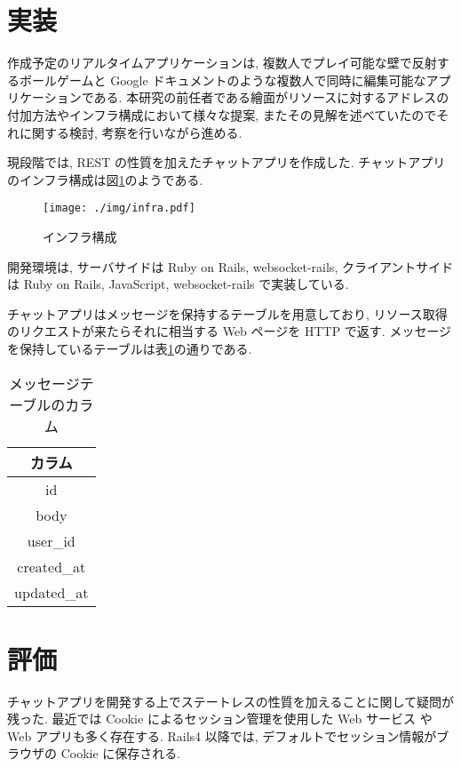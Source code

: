\documentclass[a4j, 10pt, twocolumn]{ujarticle}
\begin{document}
    \section{実装}
     作成予定のリアルタイムアプリケーションは, 複数人でプレイ可能な壁で反射するボールゲームと Google ドキュメントのような複数人で同時に編集可能なアプリケーションである.
     本研究の前任者である繪面がリソースに対するアドレスの付加方法やインフラ構成において様々な提案, またその見解を述べていた\cite{mt:YukaEzura}のでそれに関する検討, 考察を行いながら進める. 

    現段階では, REST の性質を加えたチャットアプリを作成した. 
    チャットアプリのインフラ構成は図\ref{fig:infra}のようである. 

    \begin{figure}[ht]
    \begin{center}
    \texttt{[image: ./img/infra.pdf]}
    \caption{インフラ構成}
    \label{fig:infra}
    \end{center}
    \end{figure}

    開発環境は, サーバサイドは Ruby on Rails, websocket-rails, クライアントサイドは Ruby on Rails, JavaScript, websocket-rails で実装している. 
    
    チャットアプリはメッセージを保持するテーブルを用意しており, リソース取得のリクエストが来たらそれに相当する Web ページを HTTP で返す. 
    メッセージを保持しているテーブルは表\ref{table:message_table}の通りである. 

    \begin{table}[hbtp]
      \caption{メッセージテーブルのカラム}
      \label{table:message_table}
      \centering
      \begin{tabular}{c}
        \hline
        カラム  \\
        \hline
        id  \\
        body  \\
        user\_id  \\
        created\_at  \\
        updated\_at  \\
        \hline
      \end{tabular}
    \end{table}

    \section{評価}
    チャットアプリを開発する上でステートレスの性質を加えることに関して疑問が残った. 最近では Cookie によるセッション管理を使用した Web サービス や Web アプリも多く存在する. Rails4 以降では, デフォルトでセッション情報がブラウザの Cookie に保存される. 
    
\end{document}
